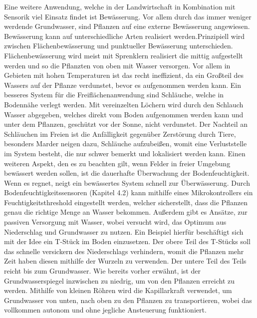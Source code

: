 Eine weitere Anwendung, welche in der Landwirtschaft in Kombination mit
Sensorik viel Einsatz findet ist Bewässerung. Vor allem durch das immer weniger
werdende Grundwasser, sind Pflanzen auf eine externe Bewässerung
angewiesen.\cite{liu2018self} Bewässerung kann auf unterschiedliche Arten
realisiert werden.Prinzipiell wird zwischen Flächenbewässerung und
punktueller Bewässerung unterschieden. Flächenbewässerung wird meist mit Sprenklern
realisiert die mittig aufgestellt werden und so die Pflanzten von oben mit
Wasser versorgen. Vor allem in Gebieten mit hohen Temperaturen ist das recht ineffizient,
da ein Großteil des Wassers auf der Pflanze verdunstet, bevor es aufgenommen
werden kann. Ein besseres System für die Freiflächenanwendung sind
Schläuche, welche in Bodennähe verlegt werden. Mit vereinzelten Löchern wird
durch den Schlauch Wasser abgegeben, welches direkt vom Boden aufgenommen
werden kann und unter dem Pflanzen, geschützt vor der Sonne, nicht verdunstet.
Der Nachteil an Schläuchen im Freien ist die Anfälligkeit gegenüber Zerstörung
durch Tiere, besonders Marder neigen dazu, Schläuche aufzubeißen, womit eine
Verluststelle im System besteht, die nur schwer bemerkt und lokalisiert werden
kann. Einen weiteren Aspekt, den es zu beachten gilt, wenn Felder in freier
Umgebung bewässert werden sollen, ist die dauerhafte Überwachung der
Bodenfeuchtigkeit. Wenn es regnet, neigt ein bewässertes System schnell zur
Überwässerung. Durch Bodenfeuchtigkeitssensoren (Kapitel 4.2) kann mithilfe
eines Mikrokontrollers ein Feuchtigkeitsthreshold eingestellt werden, welcher
sicherstellt, dass die Pflanzen genau die richtige Menge an Wasser bekommen.
Außerdem gibt es Ansätze, zur passiven Versorgung mit Wasser, wobei versucht wird, das Optimum aus Niederschlag und Grundwasser zu nutzen. Ein Beispiel
hierfür beschäftigt sich mit der Idee ein T-Stück im Boden einzusetzen. Der
obere Teil des T-Stücks soll das schnelle versickern des Niederschlags
verhindern, womit die Pflanzen mehr Zeit haben diesen mithilfe der Wurzeln zu
verwenden. Der untere Teil des Teils reicht bis zum Grundwasser. Wie bereits
vorher erwähnt, ist der Grundwasserspiegel inzwischen zu niedrig, um von den
Pflanzen erreicht zu werden. Mithilfe von kleinen Röhren wird die Kapillarkraft
verwendet, um Grundwasser von unten, nach oben zu den Pflanzen zu
transportieren, wobei das vollkommen autonom und ohne jegliche Ansteuerung
funktioniert.\cite{liu2018self}

